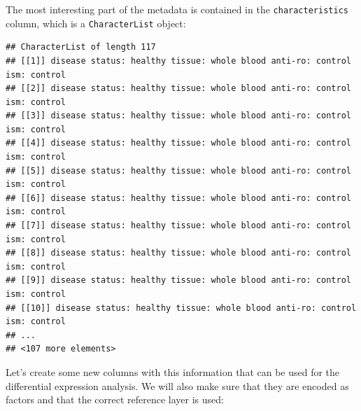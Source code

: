 \documentclass[9pt,a4paper,]{extarticle}
\newenvironment{Shaded}{\begin{snugshade}}{\end{snugshade}}
\newcommand{\KeywordTok}[1]{\textcolor[rgb]{0.13,0.29,0.53}{\textbf{#1}}}
\newcommand{\OperatorTok}[1]{\textcolor[rgb]{0.81,0.36,0.00}{\textbf{#1}}}
\newcommand{\NormalTok}[1]{#1}
\begin{document}
The most interesting part of the metadata is contained in the \texttt{characteristics} column, which is a \texttt{CharacterList} object:

\begin{Shaded}
\end{Shaded}

\begin{verbatim}
## CharacterList of length 117
## [[1]] disease status: healthy tissue: whole blood anti-ro: control ism: control
## [[2]] disease status: healthy tissue: whole blood anti-ro: control ism: control
## [[3]] disease status: healthy tissue: whole blood anti-ro: control ism: control
## [[4]] disease status: healthy tissue: whole blood anti-ro: control ism: control
## [[5]] disease status: healthy tissue: whole blood anti-ro: control ism: control
## [[6]] disease status: healthy tissue: whole blood anti-ro: control ism: control
## [[7]] disease status: healthy tissue: whole blood anti-ro: control ism: control
## [[8]] disease status: healthy tissue: whole blood anti-ro: control ism: control
## [[9]] disease status: healthy tissue: whole blood anti-ro: control ism: control
## [[10]] disease status: healthy tissue: whole blood anti-ro: control ism: control
## ...
## <107 more elements>
\end{verbatim}

Let's create some new columns with this information that can be used for the differential expression analysis.
We will also make sure that they are encoded as factors and that the correct reference layer is used:
\end{document}
